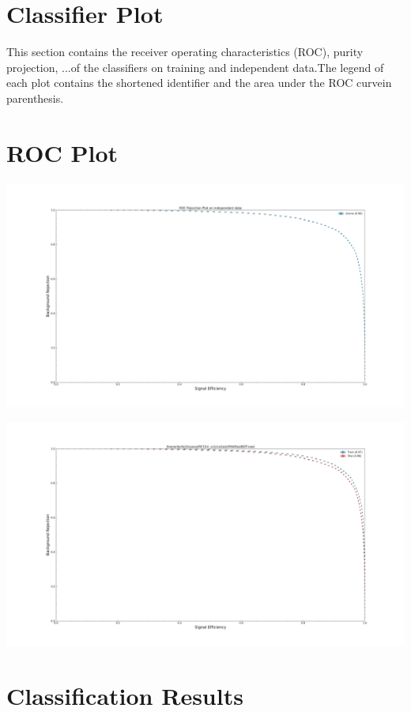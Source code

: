 \documentclass[10pt,a4paper]{article}
\begin{document}
\section{Classifier Plot}
This section contains the receiver operating characteristics (ROC), purity projection, ...of the classifiers on training and independent data.The legend of each plot contains the shortened identifier and the area under the ROC curvein parenthesis.\raggedbottom
\pagebreak[0]
\FloatBarrier
\section{ROC Plot}
\begin{center}
\includegraphics[width=1.0\textwidth]{roc_plot_test.pdf}
\end{center}
\begin{center}
\includegraphics[width=1.0\textwidth]{roc_test_-2246559386340646363.pdf}
\end{center}
\raggedbottom
\pagebreak[0]
\FloatBarrier
\section{Classification Results}
\end{document}
